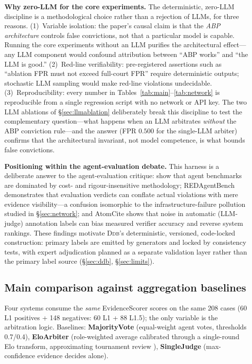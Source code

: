 \documentclass[11pt]{article}
\newcommand{\Ddb}{\textsc{Ddb}}
\begin{document}
\textbf{Why zero-LLM for the core experiments.} The deterministic,
zero-LLM discipline is a methodological choice rather than a rejection of
LLMs, for three reasons. (1)~Variable isolation: the paper's causal claim
is that the \emph{ABP architecture} controls false convictions, not that a
particular model is capable. Running the core experiments without an LLM
purifies the architectural effect—any LLM component would confound
attribution between ``ABP works'' and ``the LLM is good.'' (2)~Red-line
verifiability: pre-registered assertions such as ``ablation FPR must not
exceed full-court FPR'' require deterministic outputs; stochastic LLM
sampling would make red-line violations undecidable. (3)~Reproducibility:
every number in Tables~\ref{tab:main}--\ref{tab:network} is reproducible
from a single regression script with no network or API key. The two LLM
ablations of \S\ref{sec:llmablation} deliberately break this discipline to
test the complementary question---what happens when an LLM arbitrates
\emph{without} the ABP conviction rule---and the answer (FPR $0.500$ for
the single-LLM arbiter) confirms that the architectural invariant, not
model competence, is what bounds false convictions.

\textbf{Positioning within the agent-evaluation debate.} This harness is a
deliberate answer to the agent-evaluation critique: \citet{kapoor2024agents}
show that agent benchmarks are dominated by cost- and rigour-insensitive
methodology; REDAgentBench \citep{chen2026redagentbench} demonstrates that
evaluation verdicts can conflate actual violations with mere evidence
visibility—a confusion isomorphic to the infrastructure-failure pollution
studied in \S\ref{sec:network}; and AtomCite \citep{qian2026atomcite} shows
that noise in automatic (LLM-judge) annotation labels can bias measured
verifier accuracy and reverse system rankings. These findings motivate
\Ddb{}'s deterministic, versioned, code-locked construction: primary labels
are emitted by generators and locked by consistency tests, with expert
adjudication planned as a separate validation layer rather than the primary
label source (\S\ref{sec:ddb}, \S\ref{sec:limits}).

\subsection{Main comparison against aggregation baselines}\label{sec:main}

Four systems consume the \emph{same} EvidenceScorer scores on the same 208
cases (60 L1 positives + 148 negatives: 60 L1 + 88 L1.5); the only variable
is the arbitration logic. Baselines: \textbf{MajorityVote} (equal-weight
agent votes, thresholds 0.7/0.4), \textbf{EloArbiter} (role-weighted average
calibrated through a single-round Elo transform, approximating tournament
review \citealp{gottweis2025coscientist}), \textbf{SingleJudge}
(max-confidence evidence decides alone).
\end{document}

